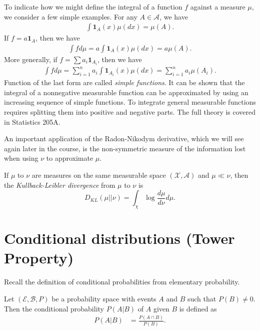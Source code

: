 \documentclass[twoside]{article}
\begin{document}
To indicate how we might define the integral of a function $f$
against a measure $\mu$, we consider a few simple examples.
For any $A \in \mathcal A$, we have
\begin{align*}
   \int \mathbf{1}_A(x) \mu(dx) = \mu(A).
\end{align*}
If $f = a \mathbf{1}_A$, then we have
\begin{align*}
   \int f d\mu = a \int \mathbf{1}_A(x) \mu(dx) = a\mu(A).
\end{align*}
More generally, if $f = \sum a_i \mathbf{1}_{A_i}$, then we have
\begin{align*}
   \int f d\mu =  \sum_{i=1}^n a_i \int \mathbf{1}_{A_i}(x) \mu(dx) = \sum_{i=1}^n a_i \mu(A_i).
\end{align*}
Function of the last form are called \emph{simple functions}.  It can be shown
that the integral of a nonnegative measurable function can be approximated by
using an increasing sequence of simple functions.  To integrate general measurable
functions requires splitting them into positive and negative parts.  The full
theory is covered in Statistics 205A.

An important application of the Radon-Nikodym derivative, which we will see
again later in the course, is the non-symmetric measure of the information
lost when using $\nu$ to approximate $\mu$.

\begin{definition}
  If  $\mu$ to $\nu$ are measures on the same measurable space
  $(\mathcal X, \mathcal A)$ and
  $\mu \ll \nu$, then the \emph{Kullback-Leibler divergence} from
  $\mu$ to $\nu$ is
  \[ D_{KL}(\mu || \nu) = \int_\chi \log \frac{d\mu}{d\nu} d\mu. \]
\end{definition}

\section{Conditional distributions (Tower Property)}

Recall the definition of conditional probabilities from elementary probability.

\begin{definition}
  Let $(\mathcal E, \mathcal B, P)$ be a probability space with events $A$ and $B$
  such that $P(B) \neq 0$.  Then the conditional probability $P(A|B)$ of $A$
  given $B$ is defined as 
  \begin{align*}
    P(A | B) &= \frac{P(A \cap B)}{P(B)}. 
  \end{align*}
\end{definition}
\end{document}
